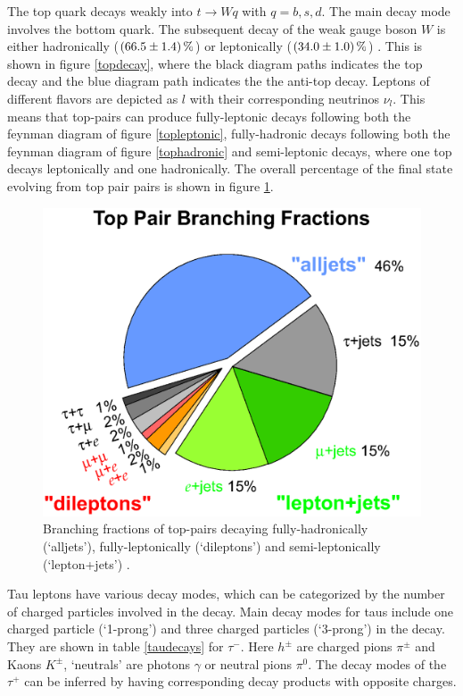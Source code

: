%
The top quark decays weakly into $t\rightarrow Wq$ with $q=b,s,d$. The main decay mode involves the bottom quark. The subsequent decay of the weak gauge boson $W$ is either hadronically ($\SI{66.5\pm 1.4}{\percent}$) or leptonically ($\SI{34\pm1.0}{\percent}$) \cite{PhysRevD}. This is shown in figure \ref{topdecay}, where the black diagram paths indicates the top decay and the blue diagram path indicates the the anti-top decay. Leptons of different flavors are depicted as $l$ with their corresponding neutrinos $\nu_l$. This means that top-pairs can produce fully-leptonic decays following both the feynman diagram of figure \ref{topleptonic}, fully-hadronic decays following both the feynman diagram of figure \ref{tophadronic} and semi-leptonic decays, where one top decays leptonically and one hadronically. The overall percentage of the final state evolving from top pair pairs is shown in figure \ref{topcake}.\newline
%
\begin{figure}[htbp]                                 
 \begin{center}                                       
  \includegraphics[width=0.6\linewidth]{figures/top_pair_branching_frac.eps} 
   \caption[Branching fractions of top-pairs.]{Branching fractions of top-pairs decaying fully-hadronically (`alljets'), fully-leptonically (`dileptons') and semi-leptonically (`lepton+jets') \cite{D0}. }
  \label{topcake}                                     
 \end{center}
\end{figure}
%
Tau leptons have various decay modes, which can be categorized by the number of charged particles involved in the decay. Main decay modes for taus include one charged particle (`1-prong') and three charged particles (`3-prong') in the decay. They are shown in table \ref{taudecays} for $\tau^-$. Here $h^{\pm}$ are charged pions $\pi^\pm$ and Kaons $K^\pm$, `neutrals' are photons $\gamma$ or neutral pions $\pi^0$. The decay modes of the $\tau^+$ can be inferred by having corresponding decay products with opposite charges.\par
